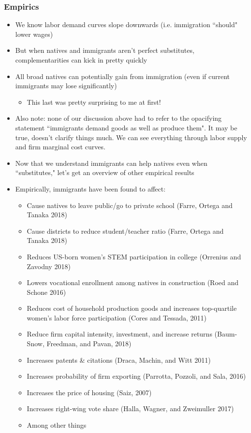 \documentclass{beamer}
\begin{document}
\begin{frame}
\frametitle{Empirics}
\begin{itemize}
\item We know labor demand curves slope downwards (i.e. immigration ``should" lower wages)
\bigskip
\item But when natives and immigrants aren't perfect substitutes, complementarities can kick in pretty quickly
\bigskip
\item All broad natives can potentially gain from immigration (even if current immigrants may lose significantly)
\bigskip
\begin{itemize}
\item This last was pretty surprising to me at first!
\bigskip
\end{itemize}
\item Also note:  none of our discussion above had to refer to the opacifying statement ``immigrants demand goods as well as produce them".  It may be true, doesn't clarify things much.  We can see everything through labor supply and firm marginal cost curves.
\bigskip
\item Now that we understand immigrants can help natives even when ``substitutes," let's get an overview of other empirical results
\end{itemize}
\end{frame}

\begin{frame}
\begin{itemize}
\item Empirically, immigrants have been found to affect:
\begin{itemize}
\item Cause natives to leave public/go to private school (Farre, Ortega and Tanaka 2018)
\item Cause districts to reduce student/teacher ratio (Farre, Ortega and Tanaka 2018)
\item Reduces US-born women's STEM participation in college (Orrenius and Zavodny 2018)
\item Lowers vocational enrollment among natives in construction (Roed and Schone 2016)
\item Reduces cost of household production goods and increases top-quartile women's labor force participation (Cores and Tessada, 2011)
\item Reduce firm capital intensity, investment, and increase returns (Baum-Snow, Freedman, and Pavan, 2018)
\item Increases patents \& citations (Draca, Machin, and Witt 2011)
\item Increases probability of firm exporting (Parrotta, Pozzoli, and Sala, 2016)
\item Increases the price of housing (Saiz, 2007)
\item Increases right-wing vote share (Halla, Wagner, and Zweimuller 2017)
\item Among other things
\end{itemize}
\end{itemize}
\end{frame}
\end{document}
